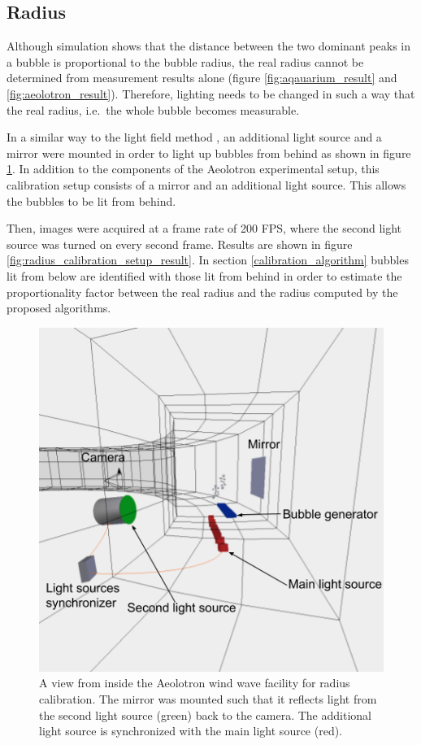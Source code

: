 			
		\subsection{Radius}\label{sub:radius_setup}
			Although simulation shows that the distance between the two dominant peaks in a bubble is proportional to the bubble radius, the real radius cannot be determined from measurement results alone (figure \ref{fig:aqauarium_result} and \ref{fig:aeolotron_result}). Therefore, lighting needs to be changed in such a way that the real radius, i.e.\ the whole bubble becomes measurable. 
			
			In a similar way to the light field method \cite{MischlerDiss}, an additional light source and a mirror were mounted in order to light up bubbles from behind as shown in figure \ref{fig:radius_calibration_setup}. In addition to the components of the Aeolotron experimental setup, this calibration setup consists of a mirror and an additional light source. This allows the bubbles to be lit from behind. 
			
			Then, images were acquired at a frame rate of 200 FPS, where the second light source was turned on every second frame. Results are shown in figure \ref{fig:radius_calibration_setup_result}. In section \ref{calibration_algorithm} bubbles lit from below are identified with those lit from behind in order to estimate the proportionality factor between the real radius and the radius computed by the proposed algorithms. 
			

			\begin{figure}
				\includegraphics[scale=.5]{images/radius_setup_fancy.png}
				\caption{A view from inside the Aeolotron wind wave facility for radius calibration. The mirror was mounted such that it reflects light from the second light source (green) back to the camera. The additional light source is synchronized with the main light source (red).}
				\label{fig:radius_calibration_setup}
			\end{figure}
			
